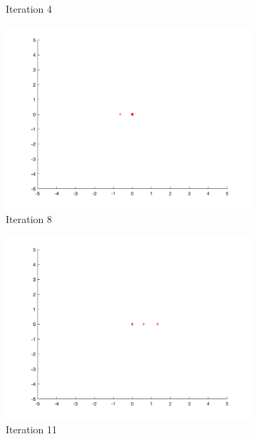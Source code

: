 \begin{figure}
\begin{subfigure}[b]{0.4\textwidth}
    \caption{Iteration 4}
    \label{fig:s1-iter-1}
  \end{subfigure}
  \begin{subfigure}[b]{0.4\textwidth}
    \includegraphics[width=\textwidth]{img/smpl/circ/loa-iter-8}
    \caption{Iteration 8}
    \label{fig:s1-iter-2}
  \end{subfigure}
  \begin{subfigure}[b]{0.4\textwidth}
    \includegraphics[width=\textwidth]{img/smpl/circ/loa-iter-11}
    \caption{Iteration 11}
    \label{fig:s1-iter-3}
  \end{subfigure}
  \begin{subfigure}[b]{0.4\textwidth}

\end{subfigure}
\end{figure}
